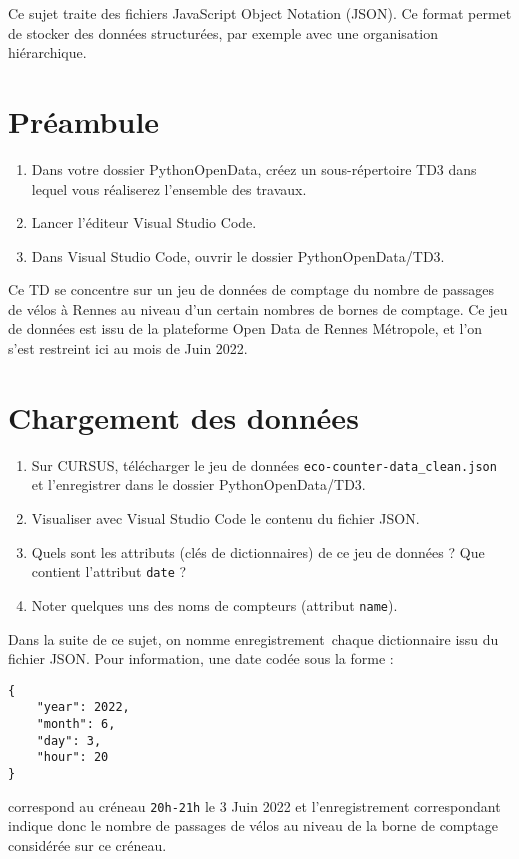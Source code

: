 \documentclass[11pt,a4paper]{article}
\begin{document}
Ce sujet traite des fichiers JavaScript Object Notation (JSON).
Ce format permet de stocker des données structurées, par exemple avec une organisation hiérarchique.

\section*{Préambule}
\begin{enumerate}
    \item Dans votre dossier PythonOpenData, créez un sous-répertoire TD3 dans lequel vous réaliserez l'ensemble des travaux.
    \item Lancer l'éditeur Visual Studio Code.
    \item Dans Visual Studio Code, ouvrir le dossier PythonOpenData/TD3. 
\end{enumerate}

Ce TD se concentre sur un jeu de données de comptage du nombre de passages de vélos à Rennes au niveau d'un certain nombres de bornes de comptage. 
Ce jeu de données est issu de la plateforme Open Data de Rennes Métropole, et l'on s'est restreint ici au mois de Juin 2022.

\section{Chargement des données}

\begin{enumerate}
    \item Sur CURSUS, télécharger le jeu de données \verb+eco-counter-data_clean.json+ et l'enregistrer dans le dossier PythonOpenData/TD3.
    \item Visualiser avec Visual Studio Code le contenu du fichier JSON.
    \item Quels sont les attributs (clés de dictionnaires) de ce jeu de données ? Que contient l'attribut \verb+date+ ?
    \item Noter quelques uns des noms de compteurs (attribut \verb+name+).
\end{enumerate}

Dans la suite de ce sujet, on nomme \og enregistrement\fg ~chaque dictionnaire issu du fichier JSON.
Pour information, une date codée sous la forme :
\begin{verbatim}
{
    "year": 2022,
    "month": 6,
    "day": 3,
    "hour": 20
}
\end{verbatim}

\noindent
correspond au créneau \verb+20h-21h+ le 3 Juin 2022 et l'enregistrement correspondant indique donc le nombre de passages de vélos au niveau de la borne de comptage considérée sur ce créneau.
\end{document}

